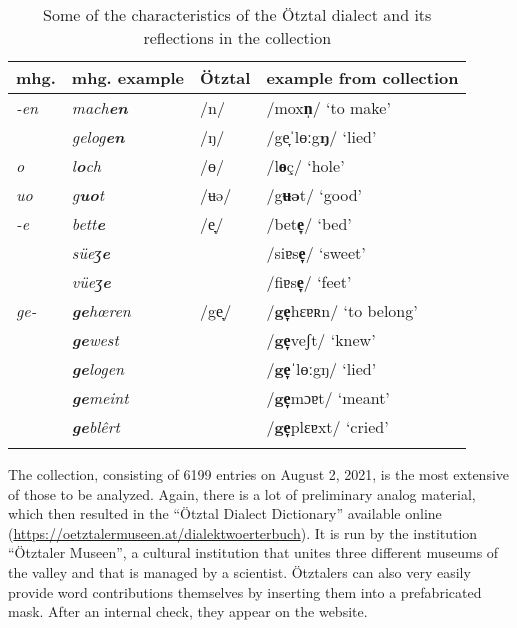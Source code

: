 \documentclass[output=paper]{langscibook}
\begin{document}
\begin{table}
\begin{tabular}{llll}
\lsptoprule
{ mhg.} & {mhg. example} & { Ötztal} & { example from collection}\\
\midrule
{ \textit{-en}} & \textit{mach}\textbf{\textit{en}} & /n/ & /mox\textbf{n̩}/ ‘to make’\\
& \textit{gelog}\textbf{\textit{en}} & /ŋ/ & /ge̞ˈlɵːg\textbf{ŋ}/ ‘lied’\\
\midrule
{ \textit{o}} & \textit{l}\textbf{\textit{o}}\textit{ch} & /ɵ/ & /l\textbf{ɵ}ç/ ‘hole’\\
\midrule
{ \textit{uo}} & \textit{g}\textbf{\textit{uo}}\textit{t} & /ʉə/ & /g\textbf{ʉə}t/ ‘good’\\
\midrule
{ \textit{-e}} & \textit{bett}\textbf{\textit{e}} & /e̞/ & /bet\textbf{e̞}/ ‘bed’ \\
& \textit{süeʒ}\textbf{\textit{e}} & & /siɐs\textbf{e̞}/ ‘sweet’\\
& \textit{vüeʒ}\textbf{\textit{e}} & & /fiɐs\textbf{e̞}/ ‘feet’\\
\midrule
{ \textit{ge-}} & \textbf{\textit{ge}}\textit{hœren} & /ge̞/ & /\textbf{ge̞}hɛɐʀn/ ‘to belong’ \\
 & \textbf{\textit{ge}}\textit{west} & & /\textbf{ge̞}veʃt/ ‘knew’     \\
 & \textbf{\textit{ge}}\textit{logen} & & /\textbf{ge̞}ˈlɵːgŋ/ ‘lied’\\
 & \textbf{\textit{ge}}\textit{meint} & & /\textbf{ge̞}mɔɐt/ ‘meant’\\
 & \textbf{\textit{ge}}\textit{blêrt} & & /\textbf{ge̞}plɛɐxt/ ‘cried’\\
\lspbottomrule
\end{tabular}
\caption{\label{tab:kathrein:2}Some of the characteristics of the Ötztal dialect and its reflections in the collection}
\end{table}

The collection, consisting of 6199 entries on August 2, 2021, is the most extensive of those to be analyzed. Again, there is a lot of preliminary analog material, which then resulted in the “Ötztal Dialect Dictionary” available online (\url{https://oetztalermuseen.at/dialektwoerterbuch}). It is run by the institution “Ötztaler Museen”, a cultural institution that unites three different museums of the valley and that is managed by a scientist. Ötztalers can also very easily provide word contributions themselves by inserting them into a prefabricated mask. After an internal check, they appear on the website. 
\end{document}
